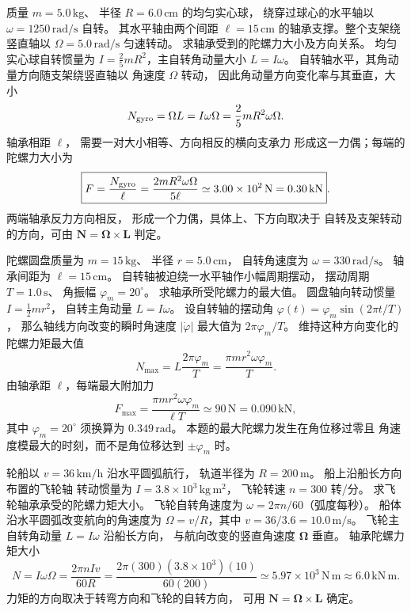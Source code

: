 质量 $m=5.0\,\mathrm{kg}$、
半径 $R=6.0\,\mathrm{cm}$ 的均匀实心球，
绕穿过球心的水平轴以
$\omega=1250\,\mathrm{rad/s}$ 自转。
其水平轴由两个间距 $\ell=15\,\mathrm{cm}$
的轴承支撑。整个支架绕竖直轴以
$\Omega=5.0\,\mathrm{rad/s}$ 匀速转动。
求轴承受到的陀螺力大小及方向关系。
\exsolution
均匀实心球自转惯量为
$I=\frac25mR^2$，主自转角动量大小 $L=I\omega$。
自转轴水平，其角动量方向随支架绕竖直轴以
角速度 $\Omega$ 转动，
因此角动量方向变化率与其垂直，大小
\[
N_{\rm gyro}=\Omega L=I\omega\Omega
=\frac25mR^2\omega\Omega.
\]
轴承相距 $\ell$，
需要一对大小相等、方向相反的横向支承力
形成这一力偶；每端的陀螺力大小为
\[
\boxed{F=\frac{N_{\rm gyro}}{\ell}
=\frac{2mR^2\omega\Omega}{5\ell}
\simeq3.00\times10^2\,\mathrm N
=0.30\,\mathrm{kN}}.
\]
\excheck 两端轴承反力方向相反，
形成一个力偶，具体上、下方向取决于
自转及支架转动的方向，可由
$\bm N=\bm\Omega\times\bm L$ 判定。

陀螺圆盘质量为 $m=15\,\mathrm{kg}$、
半径 $r=5.0\,\mathrm{cm}$，
自转角速度为 $\omega=330\,\mathrm{rad/s}$。
轴承间距为 $\ell=15\,\mathrm{cm}$。
自转轴被迫绕一水平轴作小幅周期摆动，
摆动周期 $T=1.0\,\mathrm s$、
角振幅 $\varphi_m=20^\circ$。
求轴承所受陀螺力的最大值。
\exsolution
圆盘轴向转动惯量
$I=\frac12mr^2$，
自转主角动量 $L=I\omega$。
设自转轴的摆动角
$\varphi(t)=\varphi_m\sin(2\pi t/T)$，
那么轴线方向改变的瞬时角速度
$|\dot\varphi|$ 最大值为 $2\pi\varphi_m/T$。
维持这种方向变化的陀螺力矩最大值
\[
N_{\max}=L\frac{2\pi\varphi_m}{T}
=\frac{\pi mr^2\omega\varphi_m}{T}.
\]
由轴承距 $\ell$，每端最大附加力
\[
\boxed{F_{\max}
=\frac{\pi mr^2\omega\varphi_m}{\ell T}
\simeq90\,\mathrm N=0.090\,\mathrm{kN}},
\]
其中 $\varphi_m=20^\circ$ 须换算为
$0.349\,\mathrm{rad}$。
\excheck 本题的最大陀螺力发生在角位移过零且
角速度模最大的时刻，而不是角位移达到 $\pm\varphi_m$ 时。

轮船以 $v=36\,\mathrm{km/h}$ 沿水平圆弧航行，
轨道半径为 $R=200\,\mathrm m$。
船上沿船长方向布置的飞轮轴
转动惯量为 $I=3.8\times10^3\,\mathrm{kg\,m^2}$，
飞轮转速 $n=300$ 转/分。
求飞轮轴承承受的陀螺力矩大小。
\exsolution
飞轮自转角速度为
$\omega=2\pi n/60$（弧度每秒）。
船体沿水平圆弧改变航向的角速度为
$\Omega=v/R$，其中
$v=36/3.6=10.0\,\mathrm{m/s}$。
飞轮主自转角动量
$L=I\omega$ 沿船长方向，
与航向改变的竖直角速度 $\bm\Omega$ 垂直。
轴承陀螺力矩大小
\[
\boxed{N=I\omega\Omega
=\frac{2\pi nIv}{60R}
=\frac{2\pi(300)(3.8\times10^3)(10)}{60(200)}
\simeq5.97\times10^3\,\mathrm{N\,m}
\approx6.0\,\mathrm{kN\,m}}.
\]
\excheck 力矩的方向取决于转弯方向和飞轮的自转方向，
可用 $\bm N=\bm\Omega\times\bm L$ 确定。

